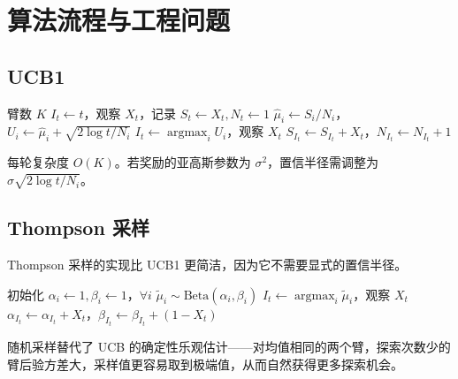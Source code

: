 \documentclass[UTF8,a4paper,11pt,zihao=5]{ctexart}
\newcommand{\argmax}{\mathop{\arg\max}}
\begin{document}
\newpage
\section{算法流程与工程问题}

\subsection{UCB1}

\begin{algorithm}[htbp]
\caption{UCB1}
\label{alg:ucb1}
\begin{algorithmic}[1]
\Require 臂数 $K$
 \State $I_t \leftarrow t$，观察 $X_t$，记录 $S_t \leftarrow X_t, N_t \leftarrow 1$ \EndFor
{}
        \State $\hat{\mu}_i \leftarrow S_i / N_i$，$U_i \leftarrow \hat{\mu}_i + \sqrt{2\log t / N_i}$
    \EndFor
    \State $I_t \leftarrow \argmax_i U_i$，观察 $X_t$
    \State $S_{I_t} \leftarrow S_{I_t} + X_t$，$N_{I_t} \leftarrow N_{I_t} + 1$
\EndFor
\end{algorithmic}
\end{algorithm}

每轮复杂度 $O(K)$。若奖励的亚高斯参数为 $\sigma^2$，置信半径需调整为 $\sigma\sqrt{2\log t / N_i}$。

\subsection{Thompson 采样}

Thompson 采样的实现比 UCB1 更简洁，因为它不需要显式的置信半径。

\begin{algorithm}[htbp]
\caption{Thompson 采样（伯努利奖励）}
\label{alg:ts}
\begin{algorithmic}[1]
\State 初始化 $\alpha_i \leftarrow 1, \beta_i \leftarrow 1$，$\forall i$ 
        \State $\tilde{\mu}_i \sim \text{Beta}(\alpha_i, \beta_i)$
    \EndFor
    \State $I_t \leftarrow \argmax_i \tilde{\mu}_i$，观察 $X_t$
    \State $\alpha_{I_t} \leftarrow \alpha_{I_t} + X_t$，$\beta_{I_t} \leftarrow \beta_{I_t} + (1-X_t)$
\EndFor
\end{algorithmic}
\end{algorithm}

随机采样替代了 UCB 的确定性乐观估计——对均值相同的两个臂，探索次数少的臂后验方差大，采样值更容易取到极端值，从而自然获得更多探索机会。
\end{document}
